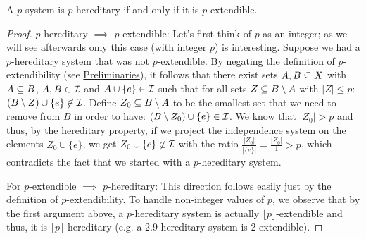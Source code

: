 \begin{proposition}
A $p$-system is $p$-hereditary if and only if it is $p$-extendible.
\end{proposition}

\begin{proof}
$p$-hereditary $\implies$ $p$-extendible: Let's first think of $p$ as an integer; as we will see afterwards only this case (with integer $p$) is interesting. Suppose we had a $p$-hereditary system that was not $p$-extendible. By negating the definition of $p$-extendibility (see \hyperref[sec:preliminaries]{Preliminaries}), it follows that there exist sets $A,B \subseteq X$ with $A \subseteq B$, $A,B \in \mathcal{I}$ and $A\cup\{e\} \in \mathcal{I}$ such that for all sets $Z\subseteq B\setminus A$ with $|Z| \le p$: $(B\setminus Z)\cup \{e\} \not\in \mathcal{I}$. Define $Z_0 \subseteq B\setminus A$ to be the smallest set that we need to remove from $B$ in order to have: $(B\setminus Z_0)\cup \{e\} \in \mathcal{I}$. We know that $|Z_0|>p$ and thus, by the hereditary property, if we project the independence system on the elements $Z_0\cup \{e\}$, we get $Z_0\cup \{e\} \not\in \mathcal{I}$ with the ratio $\tfrac{|Z_0|}{|\{e\}|}=\tfrac{|Z_0|}{1}>p$, which contradicts the fact that we started with a $p$-hereditary system.


For $p$-extendible $\implies$ $p$-hereditary: This direction follows easily just by the definition of $p$-extendibility. To handle non-integer values of $p$, we observe that by the first argument above, a $p$-hereditary system is actually $\lfloor p\rfloor$-extendible and thus, it is $\lfloor p\rfloor$-hereditary (e.g. a 2.9-hereditary system is 2-extendible).
\end{proof}

























